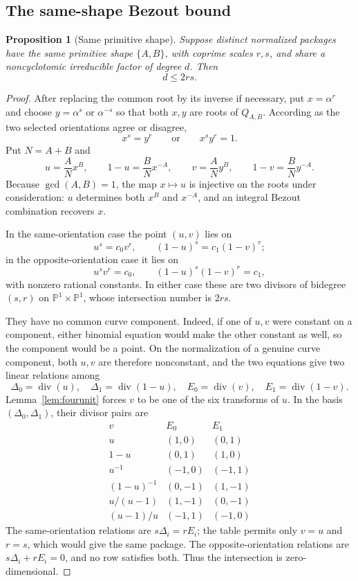 \documentclass[11pt]{article}
\newtheorem{proposition}[theorem]{Proposition}
\theoremstyle{definition}
\begin{document}
\subsection{The same-shape Bezout bound}

\begin{proposition}[Same primitive shape]
\label{prop:sameshapebezout}
Suppose distinct normalized packages have the same primitive shape
\(\{A,B\}\), with coprime scales \(r,s\), and share a noncyclotomic
irreducible factor of degree \(d\).  Then
\begin{equation}
 d\leq2rs.
 \tag{18.9}
\end{equation}
\end{proposition}

\begin{proof}
After replacing the common root by its inverse if necessary, put
\(x=\alpha^r\) and choose \(y=\alpha^s\) or \(\alpha^{-s}\) so that both
\(x,y\) are roots of \(Q_{A,B}\).  According as the two selected
orientations agree or disagree,
\[
 x^s=y^r
 \qquad\text{or}\qquad
 x^sy^r=1.
\]
Put \(N=A+B\) and
\[
 u=\frac A N x^B,
 \qquad 1-u=\frac B N x^{-A},
 \qquad
 v=\frac A N y^B,
 \qquad 1-v=\frac B N y^{-A}.
\]
Because \(\gcd(A,B)=1\), the map \(x\mapsto u\) is injective on the roots
under consideration: \(u\) determines both \(x^B\) and \(x^{-A}\), and an
integral Bezout combination recovers \(x\).

In the same-orientation case the point \((u,v)\) lies on
\[
 u^s=c_0v^r,
 \qquad
 (1-u)^s=c_1(1-v)^r;
\]
in the opposite-orientation case it lies on
\[
 u^sv^r=c_0,
 \qquad
 (1-u)^s(1-v)^r=c_1,
\]
with nonzero rational constants.  In either case these are two divisors of
bidegree \((s,r)\) on \(\mathbb P^1\times\mathbb P^1\), whose intersection
number is \(2rs\).

They have no common curve component.  Indeed, if one of \(u,v\) were
constant on a component, either binomial equation would make the other
constant as well, so the component would be a point.  On the normalization
of a genuine curve component, both \(u,v\) are therefore nonconstant, and
the two equations give two
linear relations among
\[
 \Delta_0=\operatorname{div}(u),\quad
 \Delta_1=\operatorname{div}(1-u),\quad
 E_0=\operatorname{div}(v),\quad
 E_1=\operatorname{div}(1-v).
\]
Lemma~\ref{lem:fourunit} forces \(v\) to be one of the six transforms of
\(u\).  In the basis \((\Delta_0,\Delta_1)\), their divisor pairs are
\[
\begin{array}{c|cc}
 v&E_0&E_1\\ \hline
 u&(1,0)&(0,1)\\
 1-u&(0,1)&(1,0)\\
 u^{-1}&(-1,0)&(-1,1)\\
 (1-u)^{-1}&(0,-1)&(1,-1)\\
 u/(u-1)&(1,-1)&(0,-1)\\
 (u-1)/u&(-1,1)&(-1,0)
\end{array}
\]
The same-orientation relations are \(s\Delta_i=rE_i\); the table permits
only \(v=u\) and \(r=s\), which would give the same package.  The
opposite-orientation relations are
\(s\Delta_i+rE_i=0\), and no row satisfies both.  Thus the intersection is
zero-dimensional.


\end{proof}
\end{document}
